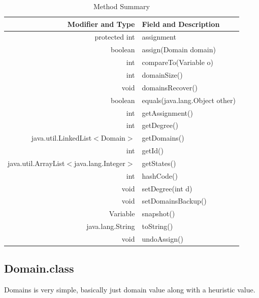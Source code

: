 \documentclass{article}
\begin{document}
\begin{table}[h]
\begin{center}
  \begin{tabular}{| r | l|  }
    \hline
    Modifier and Type & Field and Description \\ \hline
    protected int &	assignment                          \\ \hline
  boolean	&assign(Domain domain)                     \\ \hline
int&	compareTo(Variable o)                          \\ \hline
int	&domainSize()                                    \\ \hline
void&	domainsRecover()                               \\ \hline
boolean&	equals(java.lang.Object other)             \\ \hline
int	&getAssignment()                                 \\ \hline
int	&getDegree()                                     \\ \hline
java.util.LinkedList$<$Domain$>$	&getDomains()          \\ \hline
int&	getId()                                        \\ \hline
java.util.ArrayList$<$java.lang.Integer$>$&	getStates()  \\ \hline
int&	hashCode()                                     \\ \hline
void	&setDegree(int d)                              \\ \hline
void	&setDomainsBackup()                            \\ \hline
Variable	&snapshot()                                \\ \hline
java.lang.String&	toString()                         \\ \hline
void	&undoAssign()                                  \\ \hline
    \hline
  \end{tabular}
\caption{Method Summary}
\end{center}
\end{table}


\subsection{Domain.class}
Domains is very simple, basically just domain value along with a heuristic value.


\clearpage
\end{document}
